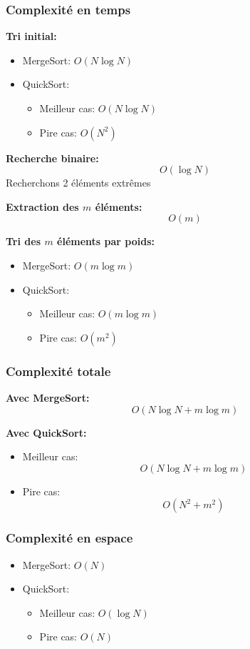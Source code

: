 \subsubsection{Complexité en temps}

\textbf{Tri initial:}
\begin{itemize}
    \item MergeSort: $O(N \log N)$
    \item QuickSort:
    \begin{itemize}
        \item Meilleur cas: $O(N \log N)$
        \item Pire cas: $O(N^2)$
    \end{itemize}
\end{itemize}

\textbf{Recherche binaire:}
\[
O(\log N)
\]
Recherchons 2 éléments extrêmes

\textbf{Extraction des $m$ éléments:}
\[
O(m)
\]

\textbf{Tri des $m$ éléments par poids:}
\begin{itemize}
    \item MergeSort: $O(m \log m)$
    \item QuickSort:
    \begin{itemize}
        \item Meilleur cas: $O(m \log m)$
        \item Pire cas: $O(m^2)$
    \end{itemize}
\end{itemize}

\subsubsection{Complexité totale}

\textbf{Avec MergeSort:}
\[
O(N \log N + m \log m)
\]

\textbf{Avec QuickSort:}
\begin{itemize}
    \item Meilleur cas:
    \[
    O(N \log N + m \log m)
    \]
    \item Pire cas:
    \[
    O(N^2 + m^2)
    \]
\end{itemize}

\subsubsection{Complexité en espace}
\begin{itemize}
    \item MergeSort: $O(N)$
    \item QuickSort:
    \begin{itemize}
        \item Meilleur cas: $O(\log N)$
        \item Pire cas: $O(N)$
    \end{itemize}
\end{itemize}

